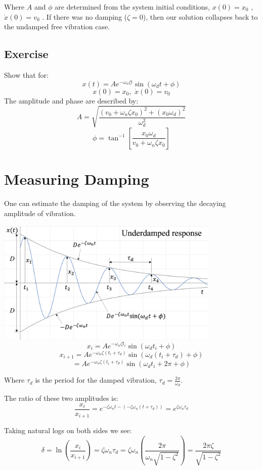 \documentclass[12pt,letterpaper,twoside]{report}
\begin{document}
Where $A$ and $\phi$ are determined from the system initial conditions, $x(0)=x_0$ , $\dot{x}(0)= v_0$ . If there was no damping ($\zeta=0$), then our solution
collapses back to the undamped free vibration case.

\subsection{Exercise}
Show that for:
\[
x(t) = A e^{-\omega_n \zeta t} \sin (\omega_d t+ \phi)
\]
\[
x(0)=x_0, \, \, \dot{x}(0)= v_0
\]
The amplitude and phase are described by:
\[
A = \sqrt{\frac{(v_0 + \omega_n \zeta x_0)^2 + (x_0 \omega_d)^2}{\omega_d^2}}
\]
\[
\phi = \tan^{-1}  \left[  \frac{x_0 \omega_d}{v_0 + \omega_n \zeta x_0} \right]
\]

\vspace*{10\baselineskip}

\section{Measuring Damping}
One can estimate the damping of the system by observing the decaying amplitude of vibration.

\includegraphics[trim={0cm 0cm 0cm 0cm},clip,width=0.8\textwidth, center]{Slide96}
\[
x_i = A e^{-\omega_n \zeta t_i} \sin (\omega_d t_i+ \phi)
\]
\[
x_{i+1} = A e^{-\omega_n \zeta (t_i + \tau_d)} \sin (\omega_d (t_i + \tau_d)+ \phi)
\]
\[
=  A e^{-\omega_n \zeta (t_i + \tau_d)} \sin (\omega_d t_i + 2 \pi+ \phi)
\]

Where $\tau_d$ is the period for the damped vibration, $\tau_d = \frac{2 \pi}{\omega_d}$.

The ratio of these two amplitudes is:
\[
\frac{x_i}{x_{i+1}} = e^{-\zeta \omega_n t - (-\zeta \omega_n(t+\tau_d))} = e^{\zeta \omega_n \tau_d}
\]

Taking natural logs on both sides we see:
\[
\delta = \ln \left( \frac{x_i}{x_{i+1}} \right) = \zeta \omega_n \tau_d = \zeta \omega_n \left( \frac{2 \pi}{\omega_n \sqrt{1-\zeta^2}} \right) = \frac{2 \pi \zeta}{\sqrt{1-\zeta^2}}
\]
\end{document}

